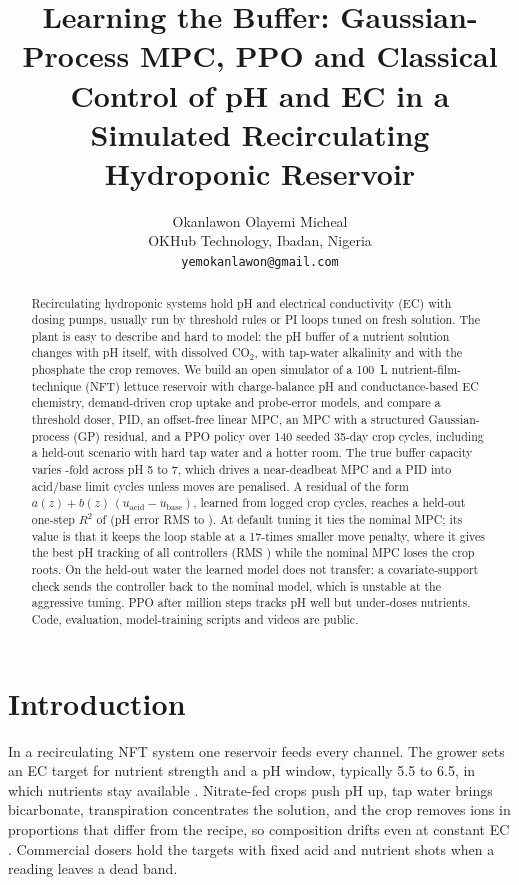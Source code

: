 \documentclass[11pt]{article}
\title{Learning the Buffer: Gaussian-Process MPC, PPO and Classical Control of pH and EC in a Simulated Recirculating Hydroponic Reservoir}
\author{Okanlawon Olayemi Micheal\\
OKHub Technology, Ibadan, Nigeria\\
\texttt{yemokanlawon@gmail.com}}
\date{}
\begin{document}
\maketitle

\begin{abstract}
Recirculating hydroponic systems hold pH and electrical conductivity (EC) with dosing pumps, usually run by threshold rules or PI loops tuned on fresh solution. The plant is easy to describe and hard to model: the pH buffer of a nutrient solution changes with pH itself, with dissolved CO$_2$, with tap-water alkalinity and with the phosphate the crop removes. We build an open simulator of a \SI{100}{L} nutrient-film-technique (NFT) lettuce reservoir with charge-balance pH and conductance-based EC chemistry, demand-driven crop uptake and probe-error models, and compare a threshold doser, PID, an offset-free linear MPC, an MPC with a structured Gaussian-process (GP) residual, and a PPO policy over 140 seeded 35-day crop cycles, including a held-out scenario with hard tap water and a hotter room. The true buffer capacity varies \nBetaRatio-fold across pH 5 to 7, which drives a near-deadbeat MPC and a PID into acid/base limit cycles unless moves are penalised. A residual of the form $a(z) + b(z)\,(u_\text{acid} - u_\text{base})$, learned from \nGpEpisodes{} logged crop cycles, reaches a held-out one-step $R^2$ of \nGpRtwo{} (pH error RMS \nGpRmseNom{} to \nGpRmseGp). At default tuning it ties the nominal MPC; its value is that it keeps the loop stable at a 17-times smaller move penalty, where it gives the best pH tracking of all controllers (RMS \nGpTTrRms) while the nominal MPC loses the crop roots. On the held-out water the learned model does not transfer: a covariate-support check sends the controller back to the nominal model, which is unstable at the aggressive tuning. PPO after \nPpoSteps{} million steps tracks pH well but under-doses nutrients. Code, evaluation, model-training scripts and videos are public.
\end{abstract}

\section{Introduction}

In a recirculating NFT system one reservoir feeds every channel. The grower sets an EC target for nutrient strength and a pH window, typically 5.5 to 6.5, in which nutrients stay available \citep{sonneveld2009nutrition}. Nitrate-fed crops push pH up, tap water brings bicarbonate, transpiration concentrates the solution, and the crop removes ions in proportions that differ from the recipe, so composition drifts even at constant EC \citep{vought2024nft}. Commercial dosers hold the targets with fixed acid and nutrient shots when a reading leaves a dead band.
\end{document}
